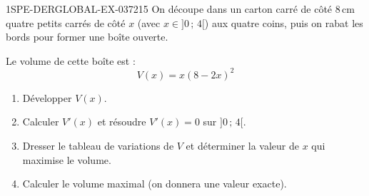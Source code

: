 \begin{exercice}{1SPE-DERGLOBAL-EX-037}{2}{15}
On découpe dans un carton carré de côté $8\,\text{cm}$ quatre petits carrés de côté $x$ (avec $x \in ]0\,;\,4[$) aux quatre coins, puis on rabat les bords pour former une boîte ouverte.

Le volume de cette boîte est :
\[
V(x) = x(8 - 2x)^2
\]

\begin{enumerate}
\item Développer $V(x)$.
\item Calculer $V'(x)$ et résoudre $V'(x) = 0$ sur $]0\,;\,4[$.
\item Dresser le tableau de variations de $V$ et déterminer la valeur de $x$ qui maximise le volume.
\item Calculer le volume maximal (on donnera une valeur exacte).
\end{enumerate}
\end{exercice}
